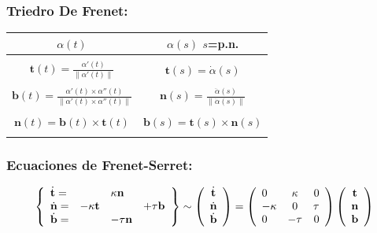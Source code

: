 \documentclass[twoside]{report}
\begin{document}
\subsubsection{Triedro De Frenet:}

\begin{center}
\begin{tabular}{|c||c|}
\hline
$\alpha(t)$ & $\alpha(s)$ \quad $s$=p.n. \\
\hline \hline
 & \\
$\displaystyle \mathbf{t}(t)=\frac{\alpha'(t)}{\parallel \alpha'(t)\parallel }$ & $ \mathbf{t}(s)= \dot{\alpha}(s)$ \\
 & \\
$\displaystyle \mathbf{b}(t)=
\frac{\alpha'(t)\times\alpha''(t)}{\parallel\alpha'(t)\times\alpha''(t)\parallel}$
& $\mathbf{n} (s)=\displaystyle \frac{\ddot{\alpha}(s)}{\parallel
\ddot{\alpha} (s)\parallel}$  \\
 & \\
$\mathbf{n}(t)=\mathbf{b}(t)\times\mathbf{t}(t)$  & $\mathbf{b}
(s)=\mathbf{t} (s)\times \mathbf{n} (s)$ \\
 & \\
 \hline
\end{tabular}
\end{center}

\subsubsection{Ecuaciones de Frenet-Serret:}

$$\left\{\begin{array}{llll}
{\dot{\mathbf{t}}}=&&\kappa\mathbf{n}& \\ {\dot{\mathbf{n}}}=&-\kappa{\bf t}&&+\tau{\bf b}\\
{\dot{\mathbf{b}}}=&&-\tau {\bf n}& \end{array}\right\} \sim
\left(
\begin{array}{c} \dot{\mathbf{t}}\\ \dot{\mathbf{n}}\\ \dot{\mathbf{b}}\end{array}\right)=
\left(
\begin{array}{lcr} 0&\kappa&0\\-\kappa&0&\tau \\0&-\tau &0
\end{array}\right)
 \left(\begin{array}{c}
\mathbf{t}\\\mathbf{n}\\\mathbf{b}\end{array}\right)$$
\end{document}
